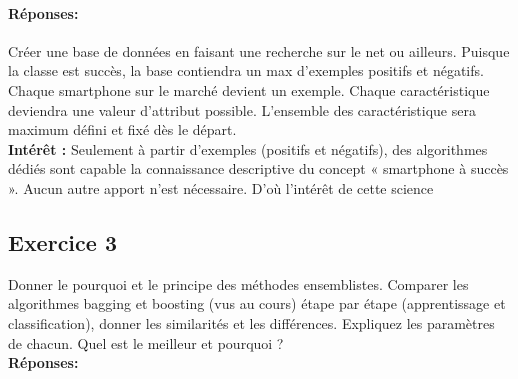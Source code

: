 \documentclass[a4paper, 12pt]{article}
\begin{document}
	\paragraph{Réponses: } Créer une base de données  en faisant une recherche sur le net ou ailleurs. Puisque la classe est succès, la base contiendra un max d’exemples positifs et négatifs. Chaque smartphone sur le marché devient un exemple. Chaque caractéristique  deviendra une valeur d’attribut possible. L’ensemble des caractéristique sera maximum défini et fixé dès le départ.\\ \textbf{Intérêt : }  Seulement à partir d’exemples (positifs et négatifs), des algorithmes dédiés sont capable la connaissance descriptive du concept « smartphone à succès ». Aucun autre apport n’est nécessaire. D’où l’intérêt de cette science
	
	\subsection*{Exercice 3 } Donner le pourquoi et le principe des méthodes ensemblistes. Comparer les algorithmes bagging et boosting (vus au cours) étape par étape (apprentissage et classification), donner les similarités et les différences. Expliquez les paramètres de chacun. Quel est le meilleur et pourquoi ?       \\	                                                 \textbf{Réponses:}
\end{document}
